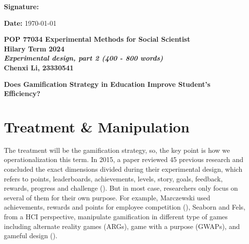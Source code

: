 \documentclass[12pt]{article} %
\begin{document}
\vspace{.7cm}


\begin{flushleft}
	\begin{minipage}{0.5\linewidth}
		\textbf{Signature:}
	\end{minipage}
\end{flushleft}

\vspace{.3cm}

\noindent \textbf{Date: } \today

\newpage
\begin{center}
	\textbf{POP 77034 Experimental Methods for Social Scientist}\\
	\textbf{Hilary Term 2024}\\
	\textbf{\textit{Experimental design, part 2 (400 - 800 words)}} \\
	\vspace{.3cm}
	\textbf{Chenxi Li, 23330541}
\end{center}

\vspace{.3cm}

\noindent \textbf{Does Gamification Strategy in Education Improve Student's Efficiency?}\\

\section*{Treatment \& Manipulation}
\noindent The treatment will be the gamification strategy, so, the key point is how we operationalization this term. 
In 2015, a paper reviewed 45 previous research and  concluded the exact dimensions divided during their experimental design, which refers to points, leaderboards, achievements, levels, story, goals, feedback, rewards, progress and challenge (\cite{hamari2014does}). But in most case, researchers only focus on several of them for their own purpose. For example, Marczewski used achievements, rewards and points for employee competition (\cite{marczewski2013gamification}), Seaborn and Fels, from a HCI perspective, manipulate gamification in different type of games including alternate reality games (ARGs), game with a purpose (GWAPs), and gameful design (\cite{seaborn2015gamification}).\\
\end{document}
